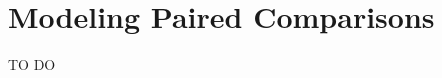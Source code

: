 \chapter{Modeling Paired Comparisons}

TO DO

\section{}

\subsubsection{}	
\begin{comment}
	\begin{lstlisting}
		GET /mychat HTTP/1.1
		Host: server.AzzurraIo.com
		Upgrade: websocket	
		Connection: Upgrade		
		Sec-WebSocket-Key: 32ndfsMjnQiZXBijAfOiPni==
		Sec-WebSocket-Protocol: chat		
		Sec-WebSocket-Version: 13		
		Origin: http://AzzurraIo.com
	\end{lstlisting}...
\end{comment}
	